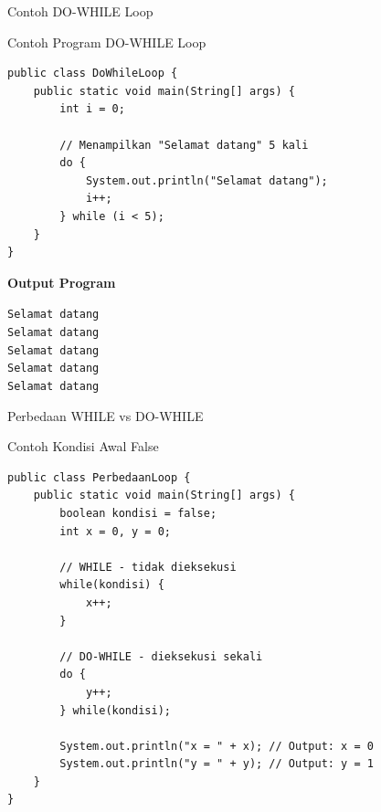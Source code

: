 \documentclass{beamer}
\begin{document}
\begin{frame}[fragile]{Contoh DO-WHILE Loop}
  \vspace{-0.2cm}
  \begin{exampleblock}{Contoh Program DO-WHILE Loop}
    \begin{lstlisting}[basicstyle=\ttfamily\scriptsize]
public class DoWhileLoop {
    public static void main(String[] args) {
        int i = 0;
        
        // Menampilkan "Selamat datang" 5 kali
        do {
            System.out.println("Selamat datang");
            i++;
        } while (i < 5);
    }
}
    \end{lstlisting}
  \end{exampleblock}

  \vspace{-0.5cm}
\textbf{Output Program}
    \colorbox{gray!20}{
      \parbox{0.9\textwidth}{
        {\scriptsize
        \texttt{Selamat datang\\[-1.2ex]
        Selamat datang\\[-1.2ex]
        Selamat datang\\[-1.2ex]
        Selamat datang\\[-1.2ex]
        Selamat datang}
        }
      }
    }
\end{frame}

\begin{frame}[fragile]{Perbedaan WHILE vs DO-WHILE}
  \vspace{-0.2cm}
  \begin{exampleblock}{Contoh Kondisi Awal False}
    \begin{lstlisting}[basicstyle=\ttfamily\scriptsize]
public class PerbedaanLoop {
    public static void main(String[] args) {
        boolean kondisi = false;
        int x = 0, y = 0;
        
        // WHILE - tidak dieksekusi
        while(kondisi) {
            x++;
        }
        
        // DO-WHILE - dieksekusi sekali
        do {
            y++;
        } while(kondisi);
        
        System.out.println("x = " + x); // Output: x = 0
        System.out.println("y = " + y); // Output: y = 1
    }
}
    \end{lstlisting}
  \end{exampleblock}
\end{frame}
\end{document}
